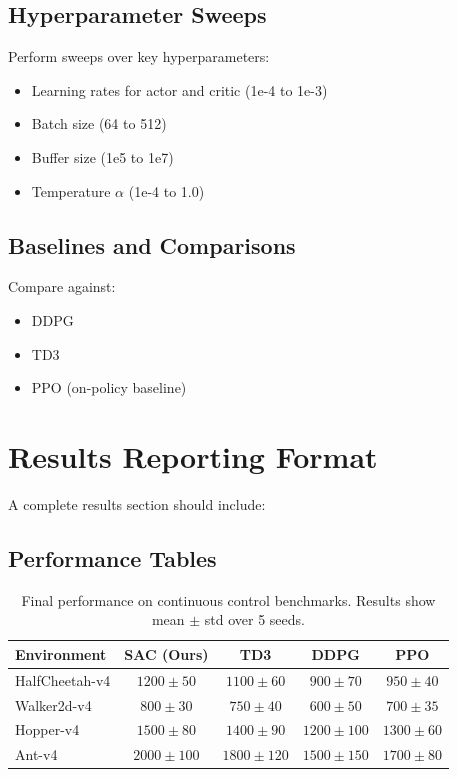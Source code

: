 \documentclass[conference]{IEEEtran}
\begin{document}
\subsection{Hyperparameter Sweeps}
Perform sweeps over key hyperparameters:
\begin{itemize}
  \item Learning rates for actor and critic (1e-4 to 1e-3)
  \item Batch size (64 to 512)
  \item Buffer size (1e5 to 1e7)
  \item Temperature $\alpha$ (1e-4 to 1.0)
\end{itemize}

\subsection{Baselines and Comparisons}
Compare against:
\begin{itemize}
  \item DDPG \citep{lillicrap2015continuous}
  \item TD3 \citep{fujimoto2018addressing}
  \item PPO \citep{schulman2017proximal} (on-policy baseline)
\end{itemize}

\section{Results Reporting Format}
A complete results section should include:

\subsection{Performance Tables}
\begin{table}[H]
\centering
\caption{Final performance on continuous control benchmarks. Results show mean $\pm$ std over 5 seeds.}
\label{tab:results}
\begin{tabular}{lcccc}
\toprule
Environment & SAC (Ours) & TD3 & DDPG & PPO \\
\midrule
HalfCheetah-v4 & $1200 \pm 50$ & $1100 \pm 60$ & $900 \pm 70$ & $950 \pm 40$ \\
Walker2d-v4 & $800 \pm 30$ & $750 \pm 40$ & $600 \pm 50$ & $700 \pm 35$ \\
Hopper-v4 & $1500 \pm 80$ & $1400 \pm 90$ & $1200 \pm 100$ & $1300 \pm 60$ \\
Ant-v4 & $2000 \pm 100$ & $1800 \pm 120$ & $1500 \pm 150$ & $1700 \pm 80$ \\
\bottomrule
\end{tabular}
\end{table}
\end{document}
